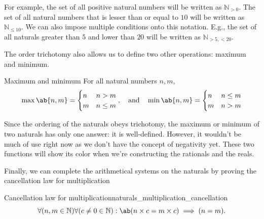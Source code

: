 For example, the set of all positive natural numbers will be written as \(\mathbb{N}_{>0}\). The set
of all natural numbers that is lesser than or equal to \(10\) will be written as
\(\mathbb{N}_{\leq 10}\). We can also impose multiple conditions onto this notation. E.g., the set
of all naturals greater than \(5\) and lower than \(20\) will be written as \(\mathbb{N}_{>5,<20}\).

The order trichotomy also allows us to define two other operations: maximum and minimum.
\begin{df}{Maximum and minimum}{}
  For all natural numbers \(n, m\),
  \begin{equation*}
    \max \ab\{n, m\} = \begin{cases}
                         n & n > m    \\
                         m & n \leq m
                       \end{cases},
    \mathand \min \ab\{n, m\} =
    \begin{cases}
      n & n \leq m \\
      m & n > m
    \end{cases}
  \end{equation*}
\end{df}

Since the ordering of the naturals obeys trichotomy, the maximum or minimum of two naturals has only
one answer: it is well-defined. However, it wouldn't be much of use right now as we don't have the
concept of negativity yet. These two functions will show its color when we're constructing the
rationals and the reals.

Finally, we can complete the arithmetical systems on the naturals by proving the cancellation law
for multiplication

\begin{lemma}{Cancellation law for multiplication}{naturals_multiplication_cancellation}
  \begin{equation*}
    \forall (n, m \in \mathbb{N}) \forall (c \neq 0 \in \mathbb{N}) : \ab(n \times c = m \times c) \implies (n = m).
  \end{equation*}
\end{lemma}

